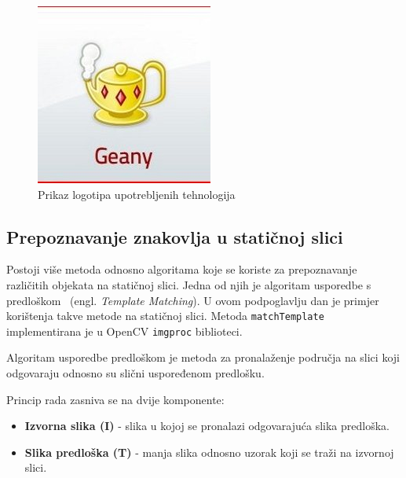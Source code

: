 \begin{figure}[!htb]
\endminipage\hfill
{}%
    \includegraphics[width=\linewidth]{figures/geany.jpg}
\endminipage
\caption{Prikaz logotipa upotrebljenih tehnologija}
\end{figure}


\newpage

\subsection{Prepoznavanje znakovlja u statičnoj slici} %
\label{sub:Algoritam usporedbe predloškom}

Postoji više metoda odnosno algoritama koje se koriste za prepoznavanje
različitih objekata na statičnoj slici. Jedna od njih je algoritam usporedbe s
predloškom~\cite{web:opencv} (engl. \textit{Template Matching}). U ovom
podpoglavlju dan je primjer korištenja takve metode na statičnoj slici. 
Metoda \texttt{matchTemplate} implementirana je u OpenCV \texttt{imgproc}
biblioteci.

Algoritam usporedbe predloškom je metoda za pronalaženje područja na
slici koji odgovaraju odnosno su slični uspoređenom predlošku. 

Princip rada zasniva se na dvije komponente:
\begin{itemize}
    \item \textbf{Izvorna slika (I)} - slika u kojoj se pronalazi
        odgovarajuća slika predloška.
    \item \textbf{Slika predloška (T)} - manja slika odnosno uzorak koji
        se traži na izvornoj slici.
\end{itemize}

